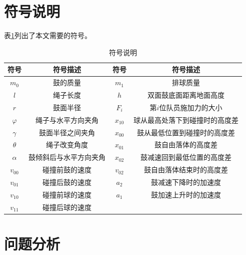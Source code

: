 \documentclass{cumcm}
\begin{document}
\newpage
\section{符号说明}
表\ref{table-symbol}列出了本文需要的符号。
\begin{table}[H]
  \centering
  \caption{符号说明}\label{table-symbol}
  \begin{tabular*}{\textwidth}{c|c|c|c}
  \hline
  符号 & 符号描述 & 符号 & 符号描述\\
  \hline
  $m_0$ & 鼓的质量 &  $m_1$ & 排球质量 \\
  $l$ & 绳子长度 &  $h$ & 双面鼓底面距离地面高度\\
  $r$ & 鼓面半径 & $F_{i}$ & 第$i$位队员施加力的大小\\
  $\varphi$ & 绳子与水平方向夹角 & $x_{10}$ & 球从最高处落下到碰撞时的高度差\\
  $\gamma$ & 鼓面半径之间夹角 &  $x_{00}$ & 鼓从最低位置到碰撞时的高度差\\
  $\theta$ & 绳子改变角度  & $x_{01}$ & 鼓自由落体的高度差 \\
  $\alpha$ & 鼓倾斜后与水平方向夹角 & $x_{02}$ & 鼓减速回到最低位置的高度差\\
  $v_{00}$ & 碰撞前鼓的速度 &  $v_{02}$ & 鼓自由落体结束时的高度差\\
  $v_{01}$ & 碰撞后鼓的速度 &  $a_2$ & 鼓减速下降时的加速度\\
  $v_{10}$ & 碰撞前球的速度 &  $a_1$ & 鼓加速上升时的加速度\\
  $v_{11}$ & 碰撞后球的速度 & \\
  \hline
  \end{tabular*}
\end{table}


\section{问题分析}
\end{document}
